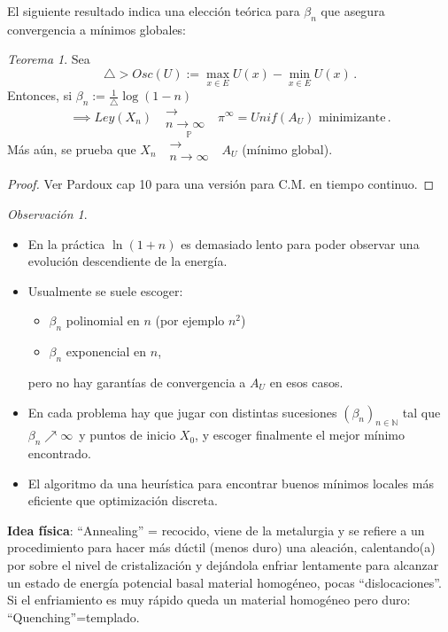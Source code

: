 \documentclass[letterpaper,11pt]{article} %
\theoremstyle{defbreak}
\theoremstyle{propbreak}
\theoremstyle{remark}
\newtheorem{remark}{Observación}[subsection]
\theoremstyle{break}
\newtheorem{theorem}{Teorema}[subsection]
\def\N{\mathbb{N}}
\def\conv{\mbox{ }\substack{\longrightarrow \\ n\to\infty}\mbox{ }}
\def\convp{\mbox{ }\overset{\mathbb{P}}{\substack{\longrightarrow \\n \to \infty}}\mbox{ }}
\def\beforeitemize{\leavevmode \vspace{-0.5\baselineskip}}
\def\gris{\color{mygray}}
\def\negro{\color{black}}
\begin{document}
El  siguiente resultado indica una elecci\'on  te\'orica para $\beta_n$ que asegura convergencia a m\'inimos globales: 


\begin{theorem}
Sea $$\triangle >Osc(U):=\displaystyle\max_{x\in E}U(x)-\min_{x\in E}U(x)\,.$$
Entonces, si $\beta_n:=\displaystyle\frac{1}{\triangle}\log(1-n)$
$$ \implies Ley(X_n)\conv\pi^\infty=Unif(A_U) \mbox{ minimizante}\,.$$
Más aún, se prueba que $X_n\convp A_U$ (mínimo global).
\end{theorem}
\begin{proof}
\gris
Ver Pardoux cap 10 \cite{pardoux} para una versión para C.M. en tiempo continuo. 
\negro
\end{proof}
\begin{remark}
\beforeitemize
\begin{itemize}
    \item En la práctica $\ln(1+n)$ es demasiado lento para poder observar una evoluci\'on descendiente de la energ\'ia.
    \item Usualmente se suele escoger:
    \begin{itemize}
        \item $\beta_n$ polinomial en $n$ (por ejemplo $n^2$)
        \item $\beta_n$ exponencial en $n$, 
    \end{itemize}
    pero no hay garantías de convergencia a $A_U$ en esos casos.
    \item En cada problema hay que jugar con distintas sucesiones $(\beta_n)_{n\in\N}$ tal que $\beta_n\nearrow \infty$\, y puntos de inicio $X_0$, y escoger finalmente el mejor m\'inimo encontrado. 
    \item El algoritmo da una heurística para encontrar buenos mínimos locales más eficiente que optimización discreta.
\end{itemize}
\end{remark}
\textbf{Idea física}:
\newline ``Annealing'' = recocido, viene de la metalurgia y se refiere a un  procedimiento para hacer más dúctil (menos duro) una aleación, calentando(a) por sobre el nivel de cristalización y dejándola enfriar lentamente para alcanzar un estado de energía potencial basal material homogéneo, pocas ``dislocaciones''.
\newline Si el enfriamiento es muy rápido queda un material homogéneo pero duro:
\newline ``Quenching''=templado.
\end{document}
